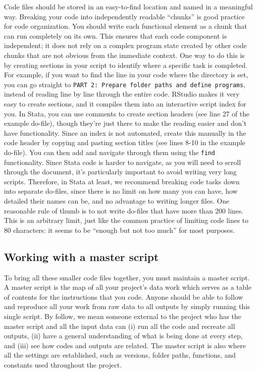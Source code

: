 Code files should be stored in an easy-to-find location and named in a meaningful way.
Breaking your code into independently readable ``chunks'' is good practice for code organization.
You should write each functional element as a chunk that can run completely on its own.
This ensures that each code component is independent;
it does not rely on a complex program state
created by other code chunks that are not obvious from the immediate context.
One way to do this is by creating sections in your script to identify where a specific task is completed.
For example, if you want to find the line in your code where the directory is set,
you can go straight to \texttt{PART 2: Prepare folder paths and define programs},
instead of reading line by line through the entire code.
RStudio makes it very easy to create sections,
and it compiles them into an interactive script index for you.
In Stata, you can use comments to create section headers
(see line 27 of the example do-file),
though they're just there to make the reading easier and don't have functionality.
Since an index is not automated,
create this manually in the code header by copying and pasting section titles
(see lines 8-10 in the example do-file).
You can then add and navigate through them using the \texttt{find} functionality.
Since Stata code is harder to navigate, as you will need to scroll through the document,
it's particularly important to avoid writing very long scripts.
Therefore, in Stata at least, we recommend breaking code tasks down
into separate do-files, since there is no limit on how many you can have,
how detailed their names can be, and no advantage to writing longer files.
One reasonable rule of thumb is to not write do-files that have more than 200 lines.
This is an arbitrary limit, just like the common practice of limiting code lines to 80 characters:
it seems to be ``enough but not too much'' for most purposes.

\subsection{Working with a master script}
To bring all these smaller code files together, you must maintain a master script.
A master script is the map of all your project's data work
which serves as a table of contents for the instructions that you code.
Anyone should be able to follow and reproduce all your work from
raw data to all outputs by simply running this single script.
By follow, we mean someone external to the project who has the master script and all the input data can
(i) run all the code and recreate all outputs,
(ii) have a general understanding of what is being done at every step, and
(iii) see how codes and outputs are related.
The master script is also where all the settings are established,
such as versions, folder paths, functions, and constants used throughout the project.

